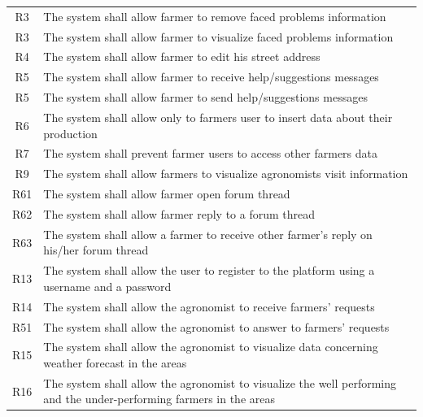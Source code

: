 \begin{center}
\begin{longtable}{|c|m{}|}
            \textsc{R3}  &    The system shall allow farmer to remove faced problems information  \\
            \textsc{R3}  &    The system shall allow farmer to visualize faced problems information  \\
            \hline
            \textsc{R4}  &    The system shall allow farmer to edit his street address  \\
            \hline
            \textsc{R5}  &    The system shall allow farmer to receive help/suggestions messages \\
            \textsc{R5}  &    The system shall allow farmer to send help/suggestions messages \\
            \hline
            \textsc{R6}  &    The system shall allow only to farmers user to insert data about their production  \\
            \hline
            \textsc{R7}  &    The system shall prevent farmer users to access other farmers data  \\
            \hline
            \textsc{R9}  &    The system shall allow farmers to visualize agronomists visit information  \\
            \hline
            \textsc{R61}  &    The system shall allow farmer open forum thread  \\
            \hline
            \textsc{R62}  &    The system shall allow farmer reply to a forum thread  \\
            \hline
            \textsc{R63}  &    The system shall allow a farmer to receive other farmer's reply on his/her forum thread  \\
            \hline
            \hline
            \hline
            \textsc{R13}  &    The system shall allow the user to register to the platform using a username and a password  \\
            \hline
            \textsc{R14}  &    The system shall allow the agronomist to receive farmers' requests  \\
            \hline
            \textsc{R51}  &    The system shall allow the agronomist to answer to farmers' requests  \\
            \hline
            \textsc{R15}  &    The system shall allow the agronomist to visualize data concerning weather forecast in the areas  \\
            \hline
            \textsc{R16}  &    The system shall allow the agronomist to visualize the well performing and the under-performing farmers in the areas  \\

\end{longtable}
\end{center}

